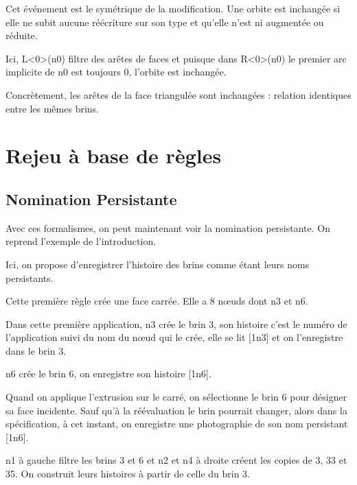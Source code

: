 \documentclass[a4paper]{article}
\begin{document}
Cet événement est le symétrique de la modification. Une orbite est inchangée si
elle ne subit aucune réécriture sur son type et qu'elle n'est ni augmentée ou
réduite.

Ici, L<0>(n0) filtre des arêtes de faces et puisque dans R<0>(n0) le premier arc
implicite de n0 est toujours 0, l'orbite est inchangée.

Concrètement, les arêtes de la face triangulée sont inchangées : relation
identiques entre les mêmes brins.

\section{Rejeu à base de règles}


\subsection{Nomination Persistante}

Avec ces formalismes, on peut maintenant voir la nomination persistante.
On reprend l'exemple de l'introduction.






Ici, on propose d'enregistrer l'histoire des brins comme étant leurs noms
persistants. %

Cette première règle crée une face carrée.
Elle a 8 nœuds dont n3 et n6.

Dans cette première application, n3 crée le brin 3, son histoire c'est le numéro de l'application suivi du nom du nœud qui le crée, elle se lit [1n3] et on l'enregistre dans le brin 3.

n6 crée le brin 6, on enregistre son histoire [1n6].

Quand on applique l'extrusion sur le carré, on sélectionne le brin 6 pour désigner sa face incidente. %
Sauf qu'à la réévaluation le brin pourrait changer, alors dans la spécification, à cet instant, on enregistre une photographie de son nom persistant [1n6].

n1 à gauche filtre les brins 3 et 6 et n2 et n4 à droite créent les copies de 3, 33 et 35. %
On construit leurs histoires à partir de celle du brin 3. %
\end{document}
